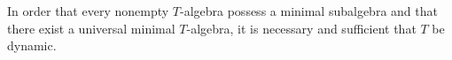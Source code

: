 In order that every nonempty $T$-algebra possess a minimal subalgebra and that there exist a universal minimal $T$-algebra, it is necessary and sufficient that $T$ be dynamic.
